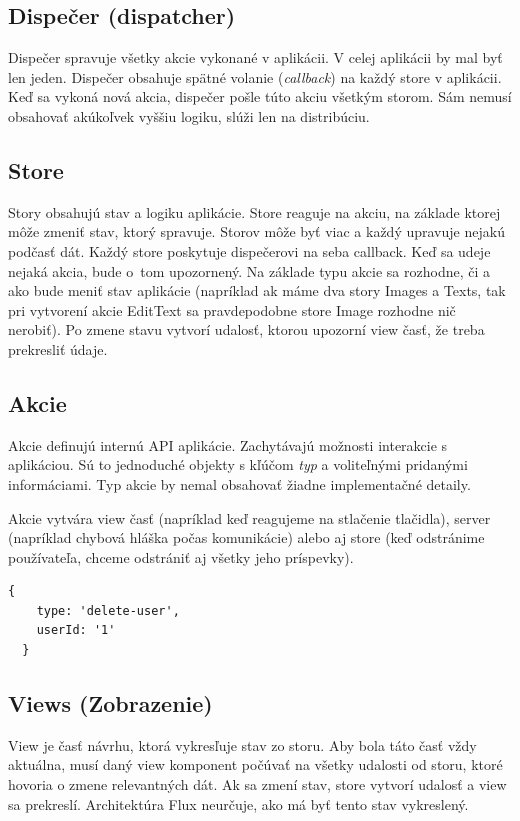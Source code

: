 \subsection{Dispečer (dispatcher)}
Dispečer spravuje všetky akcie vykonané v aplikácii. V celej aplikácii by mal byť len jeden. Dispečer obsahuje spätné volanie (\emph{callback}) na každý store v aplikácii. Keď sa vykoná nová akcia, dispečer pošle túto akciu všetkým storom. Sám nemusí obsahovať akúkoľvek vyššiu logiku, slúži len na distribúciu.

\subsection{Store}
Story obsahujú stav a logiku aplikácie. Store reaguje na akciu, na základe ktorej môže zmeniť stav, ktorý spravuje. Storov môže byť viac a každý upravuje nejakú podčasť dát. Každý store poskytuje dispečerovi na seba callback. Keď sa udeje nejaká akcia, bude o~tom upozornený. Na základe typu akcie sa rozhodne, či a ako bude meniť stav aplikácie (napríklad ak máme dva story Images a Texts, tak pri vytvorení akcie EditText sa pravdepodobne store Image rozhodne nič nerobiť). Po zmene stavu vytvorí udalosť, ktorou upozorní view časť, že treba prekresliť údaje.

\subsection{Akcie}
Akcie definujú internú API aplikácie. Zachytávajú možnosti interakcie s aplikáciou. Sú to jednoduché objekty s kľúčom \emph{typ} a voliteľnými pridanými informáciami. Typ akcie by nemal obsahovať žiadne implementačné detaily.

Akcie vytvára view časť (napríklad keď reagujeme na stlačenie tlačidla), server (napríklad chybová hláška počas komunikácie) alebo aj store (keď odstránime používateľa, chceme odstrániť aj všetky jeho príspevky).

\begin{lstlisting}[caption=Akcia vo Flux architektúre]
  {
  	type: 'delete-user',
  	userId: '1'
  }
\end{lstlisting}

\subsection{Views (Zobrazenie)}
View je časť návrhu, ktorá vykresľuje stav zo storu. Aby bola táto časť vždy aktuálna, musí daný view komponent počúvať na všetky udalosti od storu, ktoré hovoria o zmene relevantných dát. Ak sa zmení stav, store vytvorí udalosť a view sa prekreslí. Architektúra Flux neurčuje, ako má byť tento stav vykreslený.

